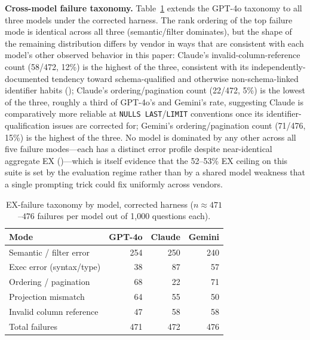 \documentclass[twocolumn]{svjour3}
\begin{document}
\textbf{Cross-model failure taxonomy.}
Table~\ref{tab:failures-crossmodel} extends the GPT-4o taxonomy to all three models under the corrected harness.
The rank ordering of the top failure mode is identical across all three (semantic/filter dominates), but the shape of the remaining distribution differs by vendor in ways that are consistent with each model's other observed behavior in this paper: Claude's invalid-column-reference count (58/472, 12\%) is the highest of the three, consistent with its independently-documented tendency toward schema-qualified and otherwise non-schema-linked identifier habits (); Claude's ordering/pagination count (22/472, 5\%) is the lowest of the three, roughly a third of GPT-4o's and Gemini's rate, suggesting Claude is comparatively more reliable at \texttt{NULLS LAST}/\texttt{LIMIT} conventions once its identifier-qualification issues are corrected for; Gemini's ordering/pagination count (71/476, 15\%) is the highest of the three.
No model is dominated by any other across all five failure modes---each has a distinct error profile despite near-identical aggregate EX ()---which is itself evidence that the 52--53\% EX ceiling on this suite is set by the evaluation regime rather than by a shared model weakness that a single prompting trick could fix uniformly across vendors.

\begin{table}[t]
\centering
\caption{EX-failure taxonomy by model, corrected harness ($n{\approx}471$--$476$ failures per model out of 1{,}000 questions each).}
\label{tab:failures-crossmodel}
\small
\begin{tabular}{@{}lrrr@{}}
\toprule
\textbf{Mode} & \textbf{GPT-4o} & \textbf{Claude} & \textbf{Gemini} \\
\midrule
Semantic / filter error & 254 & 250 & 240 \\
Exec error (syntax/type) & 38 & 87 & 57 \\
Ordering / pagination & 68 & 22 & 71 \\
Projection mismatch & 64 & 55 & 50 \\
Invalid column reference & 47 & 58 & 58 \\
\midrule
Total failures & 471 & 472 & 476 \\
\bottomrule
\end{tabular}
\end{table}
\end{document}

